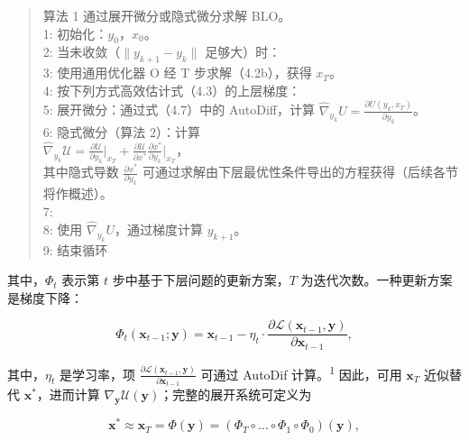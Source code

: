 \begin{quote}
\small
算法 1 通过展开微分或隐式微分求解 BLO。\\
1: 初始化：$y_{0}$，$x_{0}$。\\
2: 当未收敛（$\|y_{k+1}-y_{k}\|$ 足够大）时：\\
3: 使用通用优化器 O 经 T 步求解（4.2b），获得 $x_{T}$。\\
4: 按下列方式高效估计式（4.3）的上层梯度：\\
5: 展开微分：通过式（4.7）中的 AutoDiff，计算 $\hat{\nabla}_{y_{k}}U=\frac{\partial U(y_{k},x_{T})}{\partial y_{k}}$。\\
6: 隐式微分（算法 2）：计算\\
$\hat{\nabla}_{y_{k}}\mathcal{U}=\frac{\partial\mathcal{U}}{\partial y_{k}}\bigg|_{x_{T}}+\frac{\partial\mathcal{U}}{\partial x^{*}}\frac{\partial x^{*}}{\partial y_{k}}\bigg|_{x_{T}}$，\\
其中隐式导数 $\frac{\partial x^{*}}{\partial y_{k}}$ 可通过求解由下层最优性条件导出的方程获得（后续各节将作概述）。\\
7:\\
8: 使用 $\hat{\nabla}_{y_{k}}U$，通过梯度计算 $y_{k+1}$。\\
9: 结束循环\\
\end{quote}

其中，$\Phi _ { t }$ 表示第 $t$ 步中基于下层问题的更新方案，$T$ 为迭代次数。一种更新方案是梯度下降：

\begin{equation}
\Phi_ {t} (\boldsymbol {x} _ {t - 1}; \boldsymbol {y}) = \boldsymbol {x} _ {t - 1} - \eta_ {t} \cdot \frac {\partial \mathcal {L} (\boldsymbol {x} _ {t - 1} , \boldsymbol {y})}{\partial \boldsymbol {x} _ {t - 1}},\tag{4.5}
\end{equation}

其中，$\eta _ { t }$ 是学习率，项 $\frac { \partial \mathcal { L } ( \pmb { x } _ { t - 1 } , \pmb { y } ) } { \partial \pmb { x } _ { t - 1 } }$ 可通过 AutoDif 计算。\textsuperscript{1} 因此，可用 $\mathbf { x } _ { T }$ 近似替代 $\mathbf { \boldsymbol { x } } ^ { * }$，进而计算 $\nabla _ { \boldsymbol { y } } \boldsymbol { \mathcal { U } } ( \boldsymbol { y } )$；完整的展开系统可定义为

\begin{equation}
\boldsymbol {x} ^ {*} \approx \boldsymbol {x} _ {T} = \Phi (\boldsymbol {y}) = \left(\Phi_ {T} \circ \dots \circ \Phi_ {1} \circ \Phi_ {0}\right) (\boldsymbol {y}),\tag{4.6}
\end{equation}

